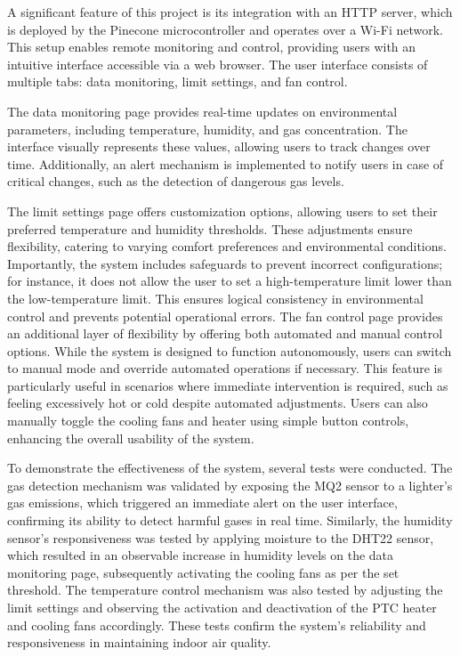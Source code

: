 \documentclass[a4paper]{scrartcl}
\begin{document}
A significant feature of this project is its integration with an HTTP server, which is deployed by the Pinecone microcontroller and operates over a Wi-Fi network. This setup enables remote monitoring and control, providing users with an intuitive interface accessible via a web browser. 
The user interface consists of multiple tabs: data monitoring, limit settings, and fan control. 

The data monitoring page provides real-time updates on environmental parameters, including temperature, humidity, and gas concentration. The interface visually represents these values, allowing users to track changes over time. Additionally, an alert mechanism is implemented to notify users in case of critical changes, such as the detection of dangerous gas levels.

The limit settings page offers customization options, allowing users to set their preferred temperature and humidity thresholds. These adjustments ensure flexibility, catering to varying comfort preferences and environmental conditions. Importantly, the system includes safeguards to prevent incorrect configurations; for instance, it does not allow the user to set a high-temperature limit lower than the low-temperature limit. This ensures logical consistency in environmental control and prevents potential operational errors.
The fan control page provides an additional layer of flexibility by offering both automated and manual control options. While the system is designed to function autonomously, users can switch to manual mode and override automated operations if necessary. This feature is particularly useful in scenarios where immediate intervention is required, such as feeling excessively hot or cold despite automated adjustments. Users can also manually toggle the cooling fans and heater using simple button controls, enhancing the overall usability of the system.

To demonstrate the effectiveness of the system, several tests were conducted. The gas detection mechanism was validated by exposing the MQ2 sensor to a lighter’s gas emissions, which triggered an immediate alert on the user interface, confirming its ability to detect harmful gases in real time. Similarly, the humidity sensor's responsiveness was tested by applying moisture to the DHT22 sensor, which resulted in an observable increase in humidity levels on the data monitoring page, subsequently activating the cooling fans as per the set threshold. The temperature control mechanism was also tested by adjusting the limit settings and observing the activation and deactivation of the PTC heater and cooling fans accordingly. These tests confirm the system’s reliability and responsiveness in maintaining indoor air quality.
\end{document}
